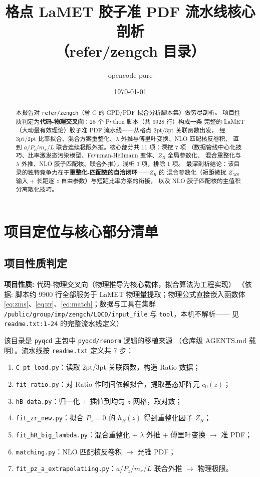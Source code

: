 \documentclass[UTF8]{ctexart}
\title{格点 LaMET 胶子准 PDF 流水线核心剖析\\（refer/zengch 目录）}
\author{opencode pure}
\date{\today}
\begin{document}
\maketitle

\begin{abstract}
本报告对 \texttt{refer/zengch}（曾 C 的 GPD/PDF 拟合分析脚本集）做穷尽剖析。
项目性质判定为\textbf{代码-物理交叉向}：28 个 Python 脚本（共 9928 行）构成一条
完整的 LaMET（大动量有效理论）胶子准 PDF 流水线——从格点 2pt/3pt 关联函数出发，
经 3pt/2pt 比率拟合、混合方案重整化、$\lambda$ 外推与傅里叶变换、NLO 匹配核反卷积、
直到 $a$/$P_z$/$m_\pi$/$L$ 联合连续极限外推。核心部分共 11 项：深挖 7 项
（数据管线中心化技巧、比率激发态污染模型、Feynman-Hellmann 变体、$Z_R$ 全局参数化、
混合重整化与 $\lambda$ 外推、NLO 胶子匹配核、联合外推），浅析 3 项，排除 1 项。
最深剖析结论：该目录的独特竞争力在于\textbf{重整化-匹配链的自洽闭环}——$Z_R$ 的
混合参数化（短距微扰 $Z_{MS}$ 输入 + 长距逐 $z$ 自由参数）与短距比率方案的衔接，
以及 NLO 胶子匹配核的主值积分离散化技巧。
\end{abstract}

\tableofcontents

\section{项目定位与核心部分清单}

\subsection{项目性质判定}

\begin{keybox}
\textbf{项目性质:} \textcolor{phys}{代码-物理交叉向（物理推导为核心载体，拟合算法为工程实现）}
（依据: 脚本约 9900 行全部服务于 LaMET 物理量提取；物理公式直接嵌入函数体
\eqref{eq:zms}、\eqref{eq:zr}、\eqref{eq:match}；数据与工具在集群
\texttt{/public/group/imp/zengch/LQCD/input\_file} 与 \texttt{tool}，本机不解析——
见 \texttt{readme.txt:1-24} 的完整流水线定义）
\end{keybox}

该目录是 \texttt{pyqcd} 主包中 \texttt{pyqcd/renorm} 逻辑的移植来源
（仓库级 AGENTS.md 载明）。流水线按 \texttt{readme.txt} 定义共 7 步：

\begin{enumerate}
  \item \texttt{C\_pt\_load.py}：读取 2pt/3pt 关联函数，构造 Ratio 数据；
  \item \texttt{fit\_ratio.py}：对 Ratio 作时间依赖拟合，提取基态矩阵元 $c_0(z)$；
  \item \texttt{hB\_data.py}：归一化 + 插值到均匀 $z$ 网格，取对数；
  \item \texttt{fit\_zr\_new.py}：拟合 $P_z=0$ 的 $h_B(z)$ 得到重整化因子 $Z_R$；
  \item \texttt{fit\_hR\_big\_lambda.py}：混合重整化 + $\lambda$ 外推 + 傅里叶变换 $\rightarrow$ 准 PDF；
  \item \texttt{matching.py}：NLO 匹配核反卷积 $\rightarrow$ 光锥 PDF；
  \item \texttt{fit\_pz\_a\_extrapolatiing.py}：$a$/$P_z$/$m_\pi$/$L$ 联合外推 $\rightarrow$ 物理极限。
\end{enumerate}
\end{document}
